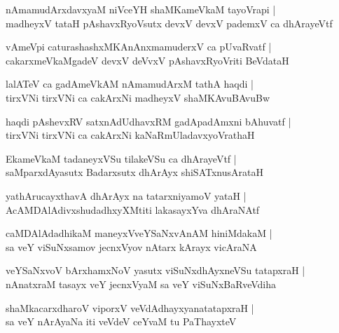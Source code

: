 \documentclass[twoside,12pt,openright]{book}
\newcounter{shloka}[chapter]
\begin{document}
\begin{shloka}%
nAmamudArxdavxyaM niVceYH shaMKameVkaM tayoVrapi |\\
madheyxV tataH pAshavxRyoVsutx devxV devxV pademxV ca dhArayeVtf 
\end{shloka}

\begin{shloka}%
vAmeVpi caturashashxMKAnAnxmamuderxV ca pUvaRvatf |\\
cakarxmeVkaMgadeV devxV deVvxV pAshavxRyoVriti BeVdataH
\end{shloka}

\begin{shloka}%
lalATeV ca gadAmeVkAM nAmamudArxM tathA haqdi |\\
tirxVNi tirxVNi ca cakArxNi madheyxV shaMKAvuBAvuBw 
\end{shloka}

\begin{shloka}%
haqdi pAshevxRV satxnAdUdhavxRM gadApadAmxni bAhuvatf |\\
tirxVNi tirxVNi ca cakArxNi kaNaRmUladavxyoVrathaH
\end{shloka}

\begin{shloka}%
EkameVkaM tadaneyxVSu tilakeVSu ca dhArayeVtf |\\
saMparxdAyasutx Badarxsutx dhArAyx shiSATxnusArataH 
\end{shloka}

\begin{shloka}%
yathArucayxthavA dhArAyx na tatarxniyamoV yataH |\\
AcAMDAlAdivxshudadhxyXMtiti lakasayxYva dhAraNAtf 
\end{shloka}

\begin{shloka}%
caMDAlAdadhikaM maneyxVveYSaNxvAnAM hiniMdakaM |\\
sa veY viSuNxsamov jecnxVyov nAtarx kArayx vicAraNA
\end{shloka}

\begin{shloka}%
veYSaNxvoV bArxhamxNoV yasutx viSuNxdhAyxneVSu tatapxraH |\\
nAnatxraM tasayx veY jecnxVyaM sa veY viSuNxBaRveVdiha
\end{shloka}

\begin{shloka}%
shaMkacarxdharoV viporxV veVdAdhayxyanatatapxraH |\\
sa veY nArAyaNa iti veVdeV ceYvaM tu PaThayxteV
\end{shloka}
\end{document}
